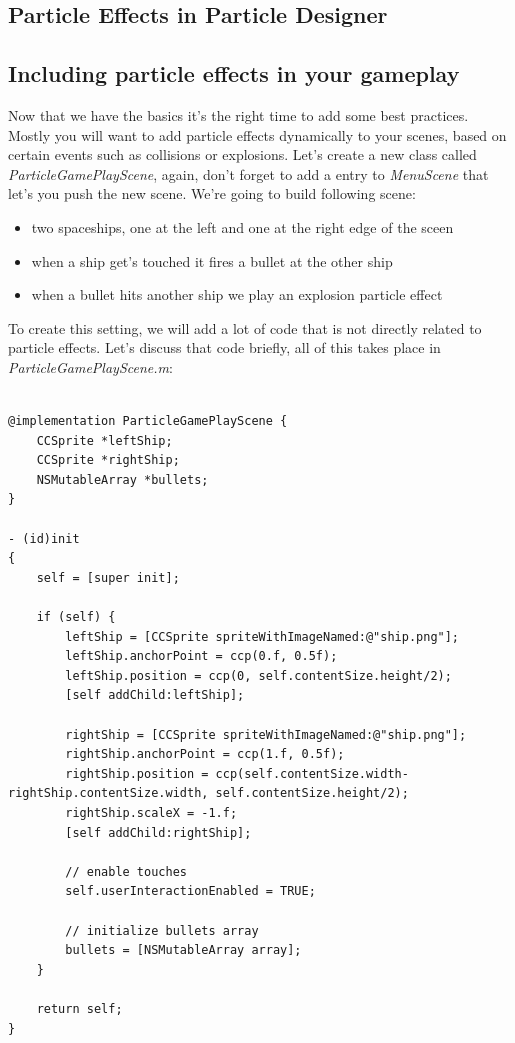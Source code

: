 \subsection{Particle Effects in Particle Designer}
\subsection{Including particle effects in your gameplay}
Now that we have the basics it's the right time to add some best practices.
Mostly you will want to add particle effects dynamically to your scenes, based
on certain events such as collisions or explosions. Let's create a new class
called \textit{ParticleGamePlayScene}, again, don't forget to add a entry to
\textit{MenuScene} that let's you push the new scene.
We're going to build following scene:
 \begin{itemize}
   \item two spaceships, one at the left and one at the right edge of the sceen
   \item when a ship get's touched it fires a bullet at the other ship
   \item when a bullet hits another ship we play an explosion particle
   effect
\end{itemize}
To create this setting, we will add a lot of code that is not directly related
to particle effects. Let's discuss that code briefly, all of this takes place
in \textit{ParticleGamePlayScene.m}:
\begin{lstlisting}[title=examples/ParticleGamePlayScene.m]

@implementation ParticleGamePlayScene {
    CCSprite *leftShip;
    CCSprite *rightShip;
    NSMutableArray *bullets;
}

- (id)init
{
    self = [super init];
    
    if (self) {
        leftShip = [CCSprite spriteWithImageNamed:@"ship.png"];
        leftShip.anchorPoint = ccp(0.f, 0.5f);
        leftShip.position = ccp(0, self.contentSize.height/2);
        [self addChild:leftShip];
        
        rightShip = [CCSprite spriteWithImageNamed:@"ship.png"];
        rightShip.anchorPoint = ccp(1.f, 0.5f);
        rightShip.position = ccp(self.contentSize.width-rightShip.contentSize.width, self.contentSize.height/2);
        rightShip.scaleX = -1.f;
        [self addChild:rightShip];
        
        // enable touches
        self.userInteractionEnabled = TRUE;
        
        // initialize bullets array
        bullets = [NSMutableArray array];
    }
    
    return self;
}
\end{lstlisting}
